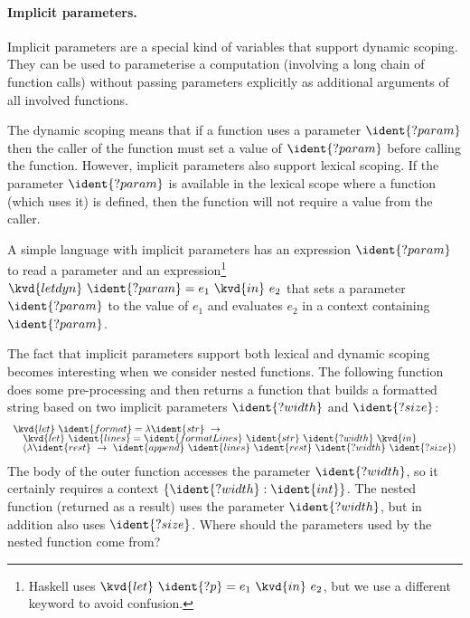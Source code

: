 \paragraph{Implicit parameters.}
Implicit parameters are a special kind of variables that support dynamic scoping.
They can be used to parameterise a computation (involving a long chain of function calls)
without passing parameters explicitly as additional arguments of all involved functions. 

The dynamic scoping means that if a function uses a parameter $\ident{?param}$ then the caller of the 
function must set a value of $\ident{?param}$ before calling the function. However, implicit 
parameters also support lexical scoping. If the parameter $\ident{?param}$ is available in the 
lexical scope where a function (which uses it) is defined, then the function will not require a
value from the caller.

A simple language with implicit parameters has an expression $\ident{?param}$ to read a parameter 
and an expression\footnote{Haskell uses $\kvd{let}~\ident{?p} = e_1~\kvd{in}~e_2$, but we use a 
different keyword to avoid confusion.} $\kvd{letdyn}~\ident{?param} = e_1~\kvd{in}~e_2$ that sets a 
parameter $\ident{?param}$ to the value of $e_1$ and evaluates $e_2$ in a context containing 
$\ident{?param}$. 

The fact that implicit parameters support both lexical and dynamic scoping becomes interesting
when we consider nested functions. The following function does some pre-processing and then returns a 
function that builds a formatted string based on two implicit parameters $\ident{?width}$ and 
$\ident{?size}$:
%
\begin{equation*}
\begin{array}{l}
\kvd{let}~\ident{format} = \lambda \ident{str}~\rightarrow \\[-0.25em]
\quad \kvd{let}~\ident{lines} = \ident{formatLines}~\ident{str}~\ident{?width}~\kvd{in}\\[-0.25em]
\quad (\lambda \ident{rest}~\rightarrow~\ident{append}~
         \ident{lines}~\ident{rest}~\ident{?width}~\ident{?size})
\end{array}
\end{equation*}
%
The body of the outer function accesses the parameter $\ident{?width}$, so it certainly requires a context 
$\{ \ident{?width} : \ident{int} \}$. The nested function (returned as a result) uses the parameter 
$\ident{?width}$, but in addition also uses $\ident{?size}$. Where should the parameters used by the 
nested function come from?

